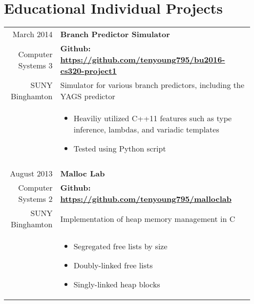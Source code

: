 \documentclass[letterpaper,10pt]{article} %
\begin{document}
\section{Educational Individual Projects}

\begin{longtable}{r|p{4.5in}}

    March 2014 & \textbf{Branch Predictor Simulator} \\
    Computer Systems 3 & \textbf{Github: \url{https://github.com/tenyoung795/bu2016-cs320-project1}} \\
    SUNY Binghamton & Simulator for various branch predictors, including the YAGS predictor \\
    & \begin{itemize}
        \item Heaviliy utilized C++11 features such as type inference, lambdas, and variadic templates
        \item Tested using Python script
    \end{itemize} \\

    \multicolumn{2}{c}{} \\

    August 2013 & \textbf{Malloc Lab} \\
    Computer Systems 2 & \textbf{Github: \url{https://github.com/tenyoung795/malloclab}} \\
    SUNY Binghamton & Implementation of heap memory management in C \\
    & \begin{itemize}
        \item Segregated free lists by size
        \item Doubly-linked free lists
        \item Singly-linked heap blocks
    \end{itemize}
\end{longtable}
\end{document}
